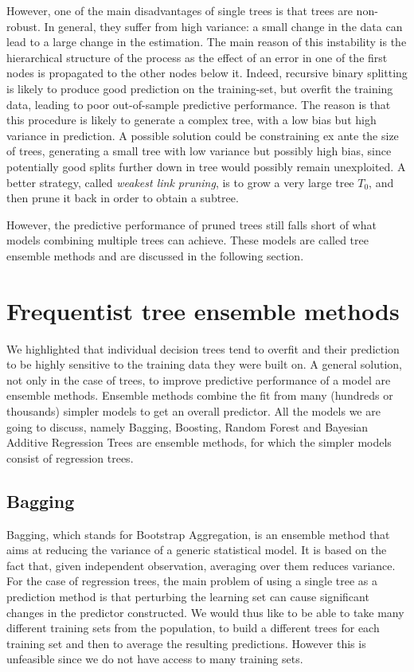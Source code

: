 \documentclass[a4paper,11pt]{article}
\begin{document}
However, one of the main disadvantages of single trees is that trees are non-robust. In general, they suffer from high variance: a small change in the data can lead to a large change in the estimation. The main reason of this instability is the hierarchical structure of the process as the effect of an error in one of the first nodes is propagated to the other nodes below it. Indeed, recursive binary splitting is likely to produce good prediction on the training-set, but overfit the training data, leading to poor out-of-sample predictive performance. The reason is that this procedure is likely to generate a complex tree, with a low bias but high variance in prediction. A possible solution could be constraining ex ante the size of trees, generating a small tree with low variance but possibly high bias, since potentially good splits further down in tree would possibly remain unexploited. A better strategy, called \textit{weakest link pruning}, is to grow a very large tree $T_0$, and then prune it back in order to obtain a subtree.

However, the predictive performance of pruned trees still falls short of what models combining multiple trees can achieve. These models are called tree ensemble methods and are discussed in the following section.

\section{Frequentist tree ensemble methods}
\label{frequentist}

We highlighted that individual decision trees tend to overfit and their prediction to be highly sensitive to the training data they were built on. A general solution, not only in the case of trees, to improve predictive performance of a model are ensemble methods. Ensemble methods combine the fit from many (hundreds or thousands) simpler models to get an overall predictor. 
All the models we are going to discuss, namely Bagging, Boosting, Random Forest and Bayesian Additive Regression Trees are ensemble methods, for which the simpler models consist of regression trees.


\subsection{Bagging}
Bagging, which stands for Bootstrap Aggregation, is an ensemble method that aims at reducing the variance of a generic statistical model. It is based on the fact that, given independent observation, averaging over them reduces variance.
For the case of regression trees, the main problem of using a single tree as a prediction method is that perturbing the learning set can cause significant changes in the predictor constructed. We would thus like to be able to take many different training sets from the population, to build a different trees for each training set and then to average the resulting predictions. However this is unfeasible since we do not have access to many training sets. 
\end{document}
